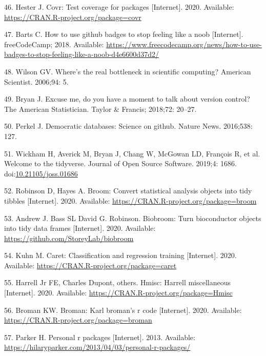 \documentclass[10pt,letterpaper]{article}
\begin{document}
\leavevmode\hypertarget{ref-covr}{}%
46. Hester J. Covr: Test coverage for packages {[}Internet{]}. 2020.
Available: \url{https://CRAN.R-project.org/package=covr}

\leavevmode\hypertarget{ref-barts2018}{}%
47. Barts C. How to use github badges to stop feeling like a noob
{[}Internet{]}. freeCodeCamp; 2018. Available:
\url{https://www.freecodecamp.org/news/how-to-use-badges-to-stop-feeling-like-a-noob-d4e6600d37d2/}

\leavevmode\hypertarget{ref-wilson2006}{}%
48. Wilson GV. Where's the real bottleneck in scientific computing?
American Scientist. 2006;94: 5.

\leavevmode\hypertarget{ref-bryan2018}{}%
49. Bryan J. Excuse me, do you have a moment to talk about version
control? The American Statistician. Taylor \& Francis; 2018;72: 20--27.

\leavevmode\hypertarget{ref-perkel2016}{}%
50. Perkel J. Democratic databases: Science on github. Nature News.
2016;538: 127.

\leavevmode\hypertarget{ref-tidyverse}{}%
51. Wickham H, Averick M, Bryan J, Chang W, McGowan LD, François R, et
al. Welcome to the tidyverse. Journal of Open Source Software. 2019;4:
1686.
doi:\href{https://doi.org/10.21105/joss.01686}{10.21105/joss.01686}

\leavevmode\hypertarget{ref-broom}{}%
52. Robinson D, Hayes A. Broom: Convert statistical analysis objects
into tidy tibbles {[}Internet{]}. 2020. Available:
\url{https://CRAN.R-project.org/package=broom}

\leavevmode\hypertarget{ref-biobroom}{}%
53. Andrew J. Bass SL David G. Robinson. Biobroom: Turn bioconductor
objects into tidy data frames {[}Internet{]}. 2020. Available:
\url{https://github.com/StoreyLab/biobroom}

\leavevmode\hypertarget{ref-caret}{}%
54. Kuhn M. Caret: Classification and regression training
{[}Internet{]}. 2020. Available:
\url{https://CRAN.R-project.org/package=caret}

\leavevmode\hypertarget{ref-Hmisc}{}%
55. Harrell Jr FE, Charles Dupont, others. Hmisc: Harrell miscellaneous
{[}Internet{]}. 2020. Available:
\url{https://CRAN.R-project.org/package=Hmisc}

\leavevmode\hypertarget{ref-broman}{}%
56. Broman KW. Broman: Karl broman's r code {[}Internet{]}. 2020.
Available: \url{https://CRAN.R-project.org/package=broman}

\leavevmode\hypertarget{ref-parker2013}{}%
57. Parker H. Personal r packages {[}Internet{]}. 2013. Available:
\url{https://hilaryparker.com/2013/04/03/personal-r-packages/}
\end{document}
